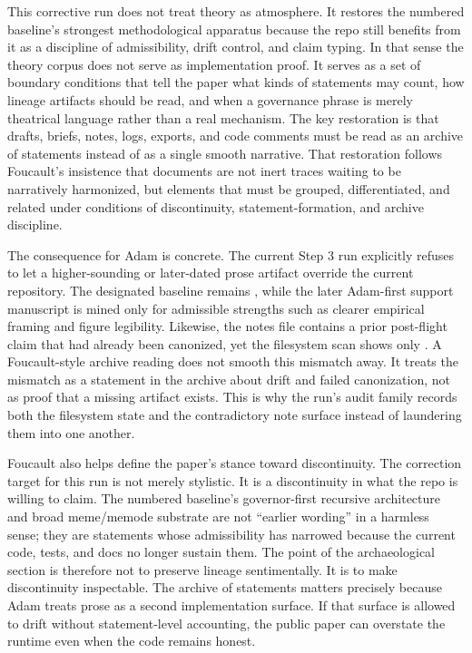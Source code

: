 \documentclass[10pt]{article}
\begin{document}
This corrective run does not treat theory as atmosphere. It restores the numbered baseline's strongest methodological apparatus because the repo still benefits from it as a discipline of admissibility, drift control, and claim typing. In that sense the theory corpus does not serve as implementation proof. It serves as a set of boundary conditions that tell the paper what kinds of statements may count, how lineage artifacts should be read, and when a governance phrase is merely theatrical language rather than a real mechanism. The key restoration is that drafts, briefs, notes, logs, exports, and code comments must be read as an archive of statements instead of as a single smooth narrative. That restoration follows Foucault's insistence that documents are not inert traces waiting to be narratively harmonized, but elements that must be grouped, differentiated, and related under conditions of discontinuity, statement-formation, and archive discipline.\cite{foucault1972}

The consequence for Adam is concrete. The current Step 3 run explicitly refuses to let a higher-sounding or later-dated prose artifact override the current repository. The designated baseline remains , while the later Adam-first support manuscript is mined only for admissible strengths such as clearer empirical framing and figure legibility. Likewise, the notes file contains a prior post-flight claim that  had already been canonized, yet the filesystem scan shows only . A Foucault-style archive reading does not smooth this mismatch away. It treats the mismatch as a statement in the archive about drift and failed canonization, not as proof that a missing artifact exists. This is why the run's audit family records both the filesystem state and the contradictory note surface instead of laundering them into one another.

Foucault also helps define the paper's stance toward discontinuity. The correction target for this run is not merely stylistic. It is a discontinuity in what the repo is willing to claim. The numbered baseline's governor-first recursive architecture and broad meme/memode substrate are not ``earlier wording'' in a harmless sense; they are statements whose admissibility has narrowed because the current code, tests, and docs no longer sustain them. The point of the archaeological section is therefore not to preserve lineage sentimentally. It is to make discontinuity inspectable. The archive of statements matters precisely because Adam treats prose as a second implementation surface. If that surface is allowed to drift without statement-level accounting, the public paper can overstate the runtime even when the code remains honest.
\end{document}
